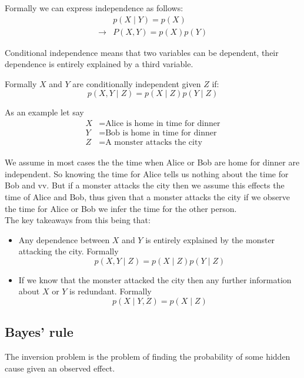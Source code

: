 \documentclass[12pt]{article}
\begin{document}
Formally we can express independence as follows:
\begin{align*}
    & p(X\mid Y) = p(X) \\
    \rightarrow & P(X, Y)  = p(X)p(Y)
\end{align*}

\begin{definition}    
    Conditional independence means that two variables can be dependent,  their dependence is entirely explained by a third variable. 
\end{definition}

Formally $X$ and $Y$ are conditionally independent given $Z$ if:
\[
    p(X, Y\mid Z) = p(X\mid Z)p(Y\mid Z)  
\]

As an example let say 
\begin{align*}
    X & = \text{Alice is home in time for dinner} \\
    Y & = \text{Bob is home in time for dinner} \\
    Z & = \text{A monster attacks the city}
\end{align*}

We assume in most cases the the time when Alice or Bob are home for dinner are independent. So knowing the time for Alice tells us nothing about the time for Bob and vv. But if a monster attacks the city then we assume this effects the time of  Alice and Bob, thus given that a monster attacks the city if we observe the time for Alice or Bob we  infer the time for the other person. \\ 
The key takeaways from this being that: 
\begin{itemize}[leftmargin=*, noitemsep]
    \item Any dependence between $X$ and $Y$ is entirely explained by the monster attacking the city. Formally 
    \[
        p(X, Y\mid Z) = p(X\mid Z)p(Y\mid Z)
    \]
    \item If we know that the monster attacked the city then any further information about $X$ or $Y$ is redundant. Formally 
    \[
        p(X\mid Y, Z) = p(X\mid Z)
    \]
\end{itemize}

\subsection{Bayes' rule}

\begin{definition}
    The inversion problem is the problem of finding the probability of some hidden cause given an observed effect. 
\end{definition}
\end{document}

